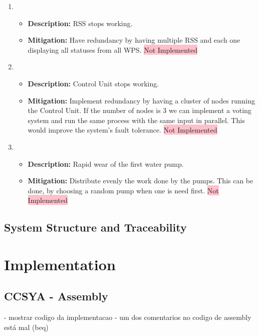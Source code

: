 \documentclass[11pt]{article}
\begin{document}
\begin{enumerate}[leftmargin=4em, font=\small, label=\textbf{H-\arabic*:}]
\begin{itemize}
		\end{itemize} 
	\item 
		\begin{itemize}
		\setlength\itemsep{0em}
    		\item \textbf{Description:} RSS stops working.
    		\item \textbf{Mitigation:} Have redundancy by having multiple RSS and each one displaying all statuses from all WPS. \colorbox{pink}{Not Implemented} 
		\end{itemize} 
	\item 
		\begin{itemize}
		\setlength\itemsep{0em}
    		\item \textbf{Description:} Control Unit stops working.
    		\item \textbf{Mitigation:} Implement redundancy by having a cluster of nodes running the Control Unit. If the number of nodes is 3 we can implement a voting system and run the same process with the same input in parallel. This would improve the system's fault tolerance. \colorbox{pink}{Not Implemented} 
		\end{itemize} 
	\item
		\begin{itemize}
		\setlength\itemsep{0em}
    		\item \textbf{Description:} Rapid wear of the first water pump.
    		\item \textbf{Mitigation:}  Distribute evenly the work done by the pumps. This can be done, by choosing a random pump when one is need first. \colorbox{pink}{Not Implemented} 
		\end{itemize} 
\end{enumerate}

\subsection{System Structure and Traceability}


\newpage
\section{Implementation}

\subsection{CCSYA - Assembly}

- mostrar codigo da implementacao
- um dos comentarios no codigo de assembly está mal (beq)
\end{document}
